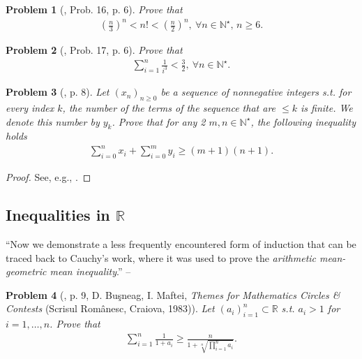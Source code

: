 \documentclass[oneside]{book}
\numberwithin{equation}{section}
\newtheorem{problem}{Problem}[section]
\begin{document}
\begin{problem}[\cite{Gelca_Andreescu2017}, Prob. 16, p. 6]
	Prove that
	\begin{align*}
		\left(\frac{n}{3}\right)^n < n! < \left(\frac{n}{2}\right)^n,\ \forall n\in\mathbb{N}^\star,\,n\ge 6.
	\end{align*}
\end{problem}

\begin{problem}[\cite{Gelca_Andreescu2017}, Prob. 17, p. 6]
	Prove that
	\begin{align*}
		\sum_{i=1}^n \frac{1}{i^3} < \frac{3}{2},\ \forall n\in\mathbb{N}^\star.
	\end{align*}
\end{problem}

\begin{problem}[\cite{Gelca_Andreescu2017}, p. 8]
	Let $(x_n)_{n\ge 0}$ be a sequence of nonnegative integers s.t. for every index $k$, the number of the terms of the sequence that are $\le k$ is finite. We denote this number by $y_k$. Prove that for any 2 $m,n\in\mathbb{N}^\star$, the following inequality holds
	\begin{align*}
		\sum_{i=0}^n x_i + \sum_{i=0}^m y_i\ge(m + 1)(n + 1).
	\end{align*}
\end{problem}

\begin{proof}[Proof]
	See, e.g., \cite[pp. 8--9]{Gelca_Andreescu2017}.
\end{proof}

\subsection{Inequalities in $\mathbb{R}$}
``Now we demonstrate a less frequently encountered form of induction that can be traced back to Cauchy's work, where it was used to prove the \textit{arithmetic mean-geometric mean inequality}.'' -- \cite[p. 9]{Gelca_Andreescu2017}

\begin{problem}[\cite{Gelca_Andreescu2017}, p. 9, D. Buşneag, I. Maftei, \textit{Themes for Mathematics Circles \& Contests} (Scrisul Românesc, Craiova, 1983)]
	Let $(a_i)_{i=1}^n\subset\mathbb{R}$ s.t. $a_i > 1$ for $i = 1,\ldots,n$. Prove that
	\begin{align*}
		\sum_{i=1}^n \frac{1}{1 + a_i}\ge\frac{n}{1 + \sqrt[n]{\prod_{i=1}^n a_i}}.
	\end{align*}
\end{problem}
\end{document}
